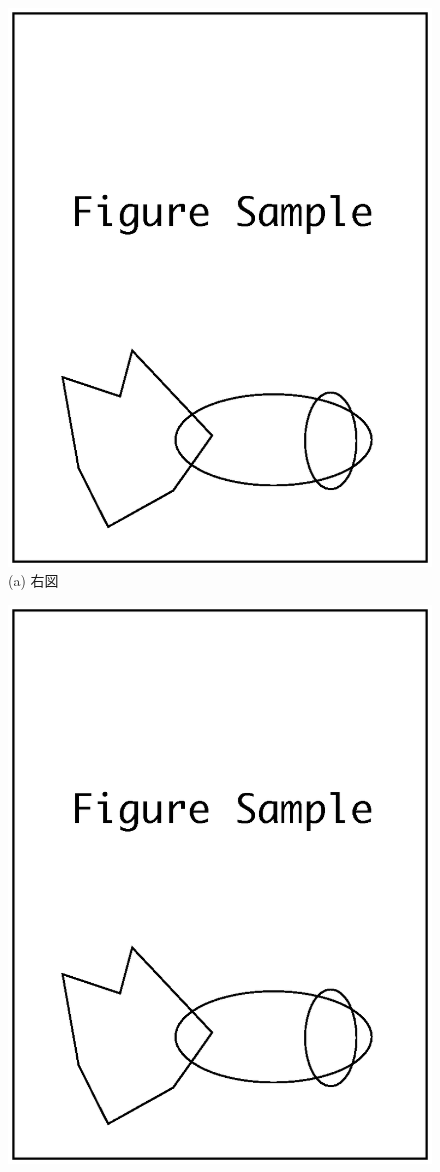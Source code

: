 \documentclass[a4j]{matsushita-zemi}
\begin{document}
\begin{figure}[t]
  \begin{minipage}{0.49\hsize}
    \begin{center}
      \includegraphics[clip, width=.8\textwidth]{figureSample2.eps}\\
      \small{(a) 右図}
    \end{center}
  \end{minipage}%
  \begin{minipage}{0.49\hsize}
    \begin{center}
      \includegraphics[clip, width=.8\textwidth]{figureSample2.eps}\\

\end{center}
\end{minipage}
\end{figure}
\end{document}
